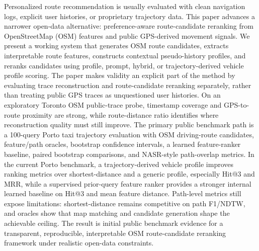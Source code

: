 Personalized route recommendation is usually evaluated with clean navigation logs, explicit user histories, or proprietary trajectory data. This paper advances a narrower open-data alternative: preference-aware route-candidate reranking from OpenStreetMap (OSM) features and public GPS-derived movement signals. We present a working system that generates OSM route candidates, extracts interpretable route features, constructs contextual pseudo-history profiles, and reranks candidates using profile, prompt, hybrid, or trajectory-derived vehicle profile scoring. The paper makes validity an explicit part of the method by evaluating trace reconstruction and route-candidate reranking separately, rather than treating public GPS traces as unquestioned user histories. On an exploratory Toronto OSM public-trace probe, timestamp coverage and GPS-to-route proximity are strong, while route-distance ratio identifies where reconstruction quality must still improve. The primary public benchmark path is a 100-query Porto taxi trajectory evaluation with OSM driving-route candidates, feature/path oracles, bootstrap confidence intervals, a learned feature-ranker baseline, paired bootstrap comparisons, and NASR-style path-overlap metrics. In the current Porto benchmark, a trajectory-derived vehicle profile improves ranking metrics over shortest-distance and a generic profile, especially Hit@3 and MRR, while a supervised prior-query feature ranker provides a stronger internal learned baseline on Hit@3 and mean feature distance. Path-level metrics still expose limitations: shortest-distance remains competitive on path F1/NDTW, and oracles show that map matching and candidate generation shape the achievable ceiling. The result is initial public benchmark evidence for a transparent, reproducible, interpretable OSM route-candidate reranking framework under realistic open-data constraints.
